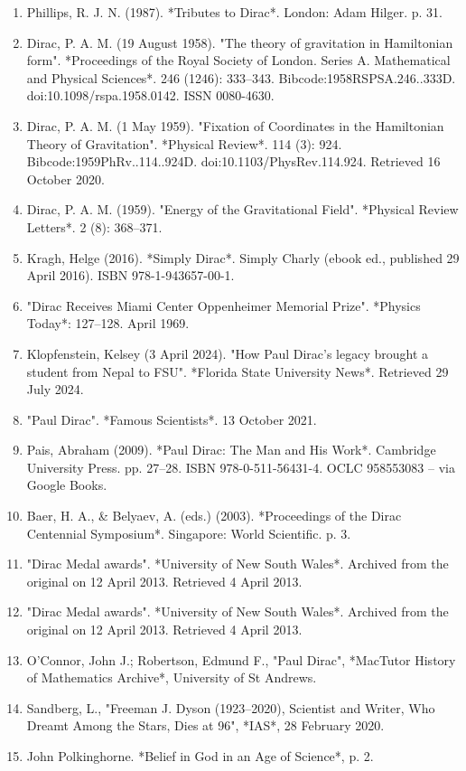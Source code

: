 \begin{enumerate}
\item Phillips, R. J. N. (1987). *Tributes to Dirac*. London: Adam Hilger. p. 31.
\item Dirac, P. A. M. (19 August 1958). "The theory of gravitation in Hamiltonian form". *Proceedings of the Royal Society of London. Series A. Mathematical and Physical Sciences*. 246 (1246): 333–343. Bibcode:1958RSPSA.246..333D. doi:10.1098/rspa.1958.0142. ISSN 0080-4630.
\item Dirac, P. A. M. (1 May 1959). "Fixation of Coordinates in the Hamiltonian Theory of Gravitation". *Physical Review*. 114 (3): 924. Bibcode:1959PhRv..114..924D. doi:10.1103/PhysRev.114.924. Retrieved 16 October 2020.
\item Dirac, P. A. M. (1959). "Energy of the Gravitational Field". *Physical Review Letters*. 2 (8): 368–371.
\item Kragh, Helge (2016). *Simply Dirac*. Simply Charly (ebook ed., published 29 April 2016). ISBN 978-1-943657-00-1.
\item "Dirac Receives Miami Center Oppenheimer Memorial Prize". *Physics Today*: 127–128. April 1969.
\item Klopfenstein, Kelsey (3 April 2024). "How Paul Dirac's legacy brought a student from Nepal to FSU". *Florida State University News*. Retrieved 29 July 2024.
\item "Paul Dirac". *Famous Scientists*. 13 October 2021.
\item Pais, Abraham (2009). *Paul Dirac: The Man and His Work*. Cambridge University Press. pp. 27–28. ISBN 978-0-511-56431-4. OCLC 958553083 – via Google Books.
\item Baer, H. A., & Belyaev, A. (eds.) (2003). *Proceedings of the Dirac Centennial Symposium*. Singapore: World Scientific. p. 3.
\item "Dirac Medal awards". *University of New South Wales*. Archived from the original on 12 April 2013. Retrieved 4 April 2013.
\item "Dirac Medal awards". *University of New South Wales*. Archived from the original on 12 April 2013. Retrieved 4 April 2013.
\item O'Connor, John J.; Robertson, Edmund F., "Paul Dirac", *MacTutor History of Mathematics Archive*, University of St Andrews.
\item Sandberg, L., "Freeman J. Dyson (1923–2020), Scientist and Writer, Who Dreamt Among the Stars, Dies at 96", *IAS*, 28 February 2020.
\item John Polkinghorne. *Belief in God in an Age of Science*, p. 2.

\end{enumerate}
